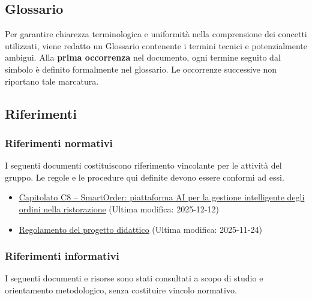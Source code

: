 \documentclass[a4paper, 11pt, oneside]{scrartcl}
\begin{document}
\subsection{Glossario}
Per garantire chiarezza terminologica e uniformità nella comprensione dei concetti utilizzati, viene redatto un Glossario{\scriptsize{}} contenente i termini tecnici e potenzialmente ambigui.
Alla \textbf{prima occorrenza} nel documento, ogni termine seguito dal simbolo {\scriptsize{}} è definito formalmente nel glossario.
Le occorrenze successive non riportano tale marcatura.

\subsection{Riferimenti}

\subsubsection{Riferimenti normativi}
I seguenti documenti costituiscono riferimento vincolante per le attività del gruppo.
Le regole e le procedure qui definite devono essere conformi ad essi.

\begin{itemize}
    \item \href{URL_CAPITOLATO_C8}{Capitolato C8 – SmartOrder: piattaforma AI per la gestione intelligente degli ordini nella ristorazione} (Ultima modifica: 2025-12-12)
    \item \href{URL_REGOLAMENTO}{Regolamento del progetto didattico} (Ultima modifica: 2025-11-24)
\end{itemize}

\subsubsection{Riferimenti informativi}
I seguenti documenti e risorse sono stati consultati a scopo di studio e orientamento metodologico, senza costituire vincolo normativo.
\end{document}
